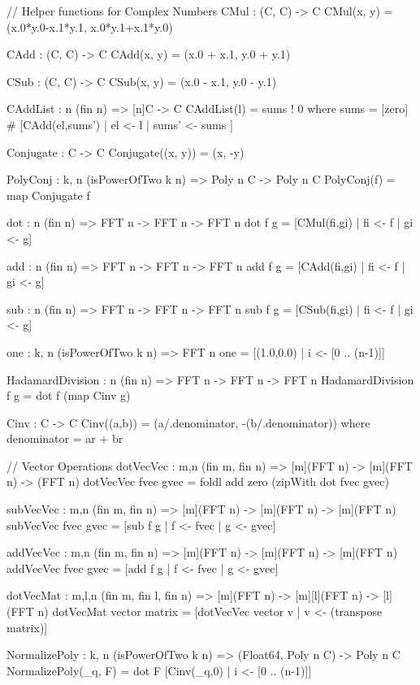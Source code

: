 \begin{code}
  // Helper functions for Complex Numbers
  CMul : (C, C) -> C
  CMul(x, y) = (x.0*y.0-x.1*y.1, x.0*y.1+x.1*y.0)

  CAdd : (C, C) -> C
  CAdd(x, y) = (x.0 + x.1, y.0 + y.1)

  CSub : (C, C) -> C
  CSub(x, y) = (x.0 - x.1, y.0 - y.1)

  CAddList : {n} (fin n) => [n]C -> C
  CAddList(l) = sums ! 0
    where sums = [zero] # [CAdd(el,sums') | el <- l
                                          | sums' <- sums
                          ]

  Conjugate : C -> C
  Conjugate((x, y)) = (x, -y)

  PolyConj : {k, n} (isPowerOfTwo k n) => Poly n C -> Poly n C
  PolyConj(f) = map Conjugate f

  dot : {n} (fin n) => FFT n -> FFT n -> FFT n
  dot f g = [CMul(fi,gi) | fi <- f | gi <- g]

  add : {n} (fin n) => FFT n -> FFT n -> FFT n
  add f g = [CAdd(fi,gi) | fi <- f | gi <- g]

  sub : {n} (fin n) => FFT n -> FFT n -> FFT n
  sub f g = [CSub(fi,gi) | fi <- f | gi <- g]

  one : {k, n} (isPowerOfTwo k n) => FFT n
  one = [(1.0,0.0) | i <- [0 .. (n-1)]]

  HadamardDivision : {n} (fin n) => FFT n -> FFT n -> FFT n
  HadamardDivision f g = dot f (map Cinv g)

  Cinv : C -> C
  Cinv((a,b)) = (a/.denominator, -(b/.denominator)) where
    denominator = a^^2 + b^^2
\end{code}
\begin{code}
  // Vector Operations
  dotVecVec : {m,n} (fin m, fin n) => [m](FFT n) -> [m](FFT n) -> (FFT n)
  dotVecVec fvec gvec = foldl add zero (zipWith dot fvec gvec)

  subVecVec : {m,n} (fin m, fin n) => [m](FFT n) -> [m](FFT n) -> [m](FFT n)
  subVecVec fvec gvec = [sub f g | f <- fvec | g <- gvec]

  addVecVec : {m,n} (fin m, fin n) => [m](FFT n) -> [m](FFT n) -> [m](FFT n)
  addVecVec fvec gvec = [add f g | f <- fvec | g <- gvec]

  dotVecMat : {m,l,n} (fin m, fin l, fin n) =>
    [m](FFT n) -> [m][l](FFT n) -> [l](FFT n)
  dotVecMat vector matrix = [dotVecVec vector v | v <- (transpose matrix)]

  NormalizePoly : {k, n} (isPowerOfTwo k n) =>
    (Float64, Poly n C) -> Poly n C
  NormalizePoly(_q, F) = dot F [Cinv(_q,0) | i <- [0 .. (n-1)]]
\end{code}

